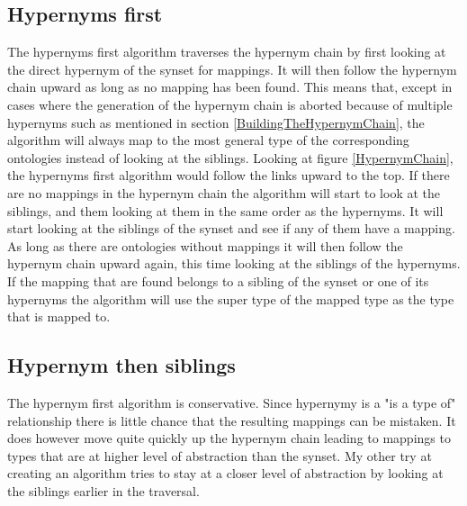 \subsection{Hypernyms first}
The hypernyms first algorithm traverses the hypernym chain by first looking at the direct hypernym of the synset for mappings.
It will then follow the hypernym chain upward as long as no mapping has been found.
This means that,
except in cases where the generation of the hypernym chain is aborted because of multiple hypernyms such as mentioned in section \ref{BuildingTheHypernymChain},
the algorithm will always map to the most general type of the corresponding ontologies instead of looking at the siblings.
Looking at figure \ref{HypernymChain}, the hypernyms first algorithm would follow the links upward to the top.
If there are no mappings in the hypernym chain the algorithm will start to look at the siblings,
and them looking at them in the same order as the hypernyms.
It will start looking at the siblings of the synset and see if any of them have a mapping.
As long as there are ontologies without mappings it will then follow the hypernym chain upward again,
this time looking at the siblings of the hypernyms.
If the mapping that are found belongs to a sibling of the synset or one of its hypernyms the algorithm will use the super type of the mapped
type as the type that is mapped to.

\subsection{Hypernym then siblings}
The hypernym first algorithm is conservative.
Since hypernymy is a "is a type of" relationship there is little chance that the resulting mappings can be mistaken.
It does however move quite quickly up the hypernym chain leading to mappings to types that are at higher level
of abstraction than the synset.
My other try at creating an algorithm tries to stay at a closer level of abstraction by looking at the siblings earlier
in the traversal.

